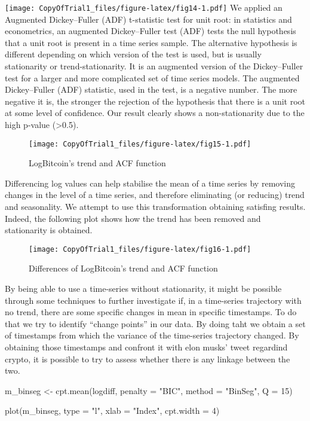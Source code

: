 \documentclass[
]{article}
\newenvironment{Shaded}{\begin{snugshade}}{\end{snugshade}}
\newcommand{\AttributeTok}[1]{\textcolor[rgb]{0.77,0.63,0.00}{#1}}
\newcommand{\DecValTok}[1]{\textcolor[rgb]{0.00,0.00,0.81}{#1}}
\newcommand{\FunctionTok}[1]{\textcolor[rgb]{0.00,0.00,0.00}{#1}}
\newcommand{\NormalTok}[1]{#1}
\newcommand{\OtherTok}[1]{\textcolor[rgb]{0.56,0.35,0.01}{#1}}
\newcommand{\StringTok}[1]{\textcolor[rgb]{0.31,0.60,0.02}{#1}}
\begin{document}
\texttt{[image: CopyOfTrial1\_files/figure-latex/fig14-1.pdf]} We applied
an Augmented Dickey--Fuller (ADF) t-statistic test for unit root: in
statistics and econometrics, an augmented Dickey--Fuller test (ADF)
tests the null hypothesis that a unit root is present in a time series
sample. The alternative hypothesis is different depending on which
version of the test is used, but is usually stationarity or
trend-stationarity. It is an augmented version of the Dickey--Fuller
test for a larger and more complicated set of time series models. The
augmented Dickey--Fuller (ADF) statistic, used in the test, is a
negative number. The more negative it is, the stronger the rejection of
the hypothesis that there is a unit root at some level of confidence.
Our result clearly shows a non-stationarity due to the high p-value
(\textgreater0.5).

\begin{figure}
\centering
\texttt{[image: CopyOfTrial1\_files/figure-latex/fig15-1.pdf]}
\caption{\label{fig:fig15}LogBitcoin's trend and ACF function}
\end{figure}

Differencing log values can help stabilise the mean of a time series by
removing changes in the level of a time series, and therefore
eliminating (or reducing) trend and seasonality. We attempt to use this
transformation obtaining satisfing results. Indeed, the following plot
shows how the trend has been removed and stationarity is obtained.

\begin{figure}
\centering
\texttt{[image: CopyOfTrial1\_files/figure-latex/fig16-1.pdf]}
\caption{\label{fig:fig16}Differences of LogBitcoin's trend and ACF
function}
\end{figure}

By being able to use a time-series without stationarity, it might be
possible through some techniques to further investigate if, in a
time-series trajectory with no trend, there are some specific changes in
mean in specific timestamps. To do that we try to identify ``change
points'' in our data. By doing taht we obtain a set of timestamps from
which the variance of the time-series trajectory
changed.\autocite{SurveyMethodsTime} By obtaining those timestamps and
confront it with elon musks' tweet regardind crypto, it is possible to
try to assess whether there is any linkage between the two.

\begin{Shaded}
\begin{Highlighting}[]
\NormalTok{m\_binseg }\OtherTok{\textless{}{-}} \FunctionTok{cpt.mean}\NormalTok{(logdiff, }\AttributeTok{penalty =} \StringTok{"BIC"}\NormalTok{, }\AttributeTok{method =} \StringTok{"BinSeg"}\NormalTok{, }\AttributeTok{Q =} \DecValTok{15}\NormalTok{)}

\FunctionTok{plot}\NormalTok{(m\_binseg, }\AttributeTok{type =} \StringTok{"l"}\NormalTok{, }\AttributeTok{xlab =} \StringTok{"Index"}\NormalTok{, }\AttributeTok{cpt.width =} \DecValTok{4}\NormalTok{)}
\end{Highlighting}
\end{Shaded}
\end{document}
